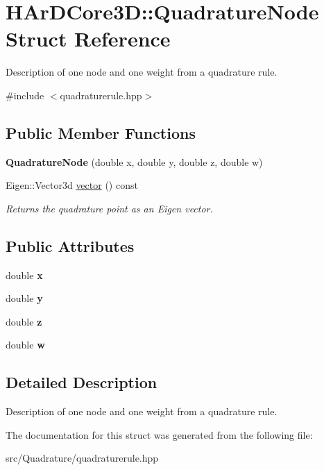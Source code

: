 \hypertarget{structHArDCore3D_1_1QuadratureNode}{}\section{H\+Ar\+D\+Core3D\+:\+:Quadrature\+Node Struct Reference}
\label{structHArDCore3D_1_1QuadratureNode}


Description of one node and one weight from a quadrature rule.  




{\ttfamily \#include $<$quadraturerule.\+hpp$>$}

\subsection*{Public Member Functions}
\begin{DoxyCompactItemize}
\item 
{\bfseries Quadrature\+Node} (double x, double y, double z, double w)
\item 
Eigen\+::\+Vector3d \hyperlink{group__Quadratures_gac0d94c3725c0502056333f314fb48fc9}{vector} () const
\begin{DoxyCompactList}\small\item\em Returns the quadrature point as an Eigen vector. \end{DoxyCompactList}\end{DoxyCompactItemize}
\subsection*{Public Attributes}
\begin{DoxyCompactItemize}
\item 
double {\bfseries x}
\item 
double {\bfseries y}
\item 
double {\bfseries z}
\item 
double {\bfseries w}
\end{DoxyCompactItemize}


\subsection{Detailed Description}
Description of one node and one weight from a quadrature rule. 

The documentation for this struct was generated from the following file\+:\begin{DoxyCompactItemize}
\item 
src/\+Quadrature/quadraturerule.\+hpp\end{DoxyCompactItemize}
